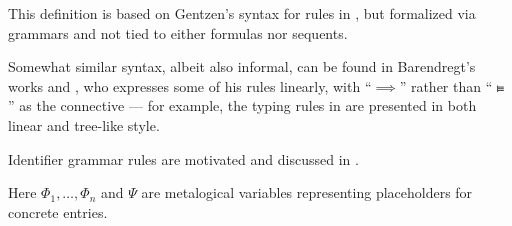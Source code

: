 \begin{comments}
  \item This definition is based on Gentzen's syntax for rules in \cite[181]{Gentzen1935LogischeSchließen}, but formalized via grammars and not tied to either formulas nor sequents.

  \item Somewhat similar syntax, albeit also informal, can be found in Barendregt's works \cite{Barendregt1984LambdaCalculus} and \cite{Barendregt1992Types}, who expresses some of his rules linearly, with \enquote{\( {\implies} \)} rather than \enquote{\( \vDdash \)} as the connective --- for example, the typing rules in \cite[def. 3.1.3]{Barendregt1992Types} are presented in both linear and tree-like style.

  \item Identifier grammar rules are motivated and discussed in .

  \item Here \( \Phi_1, \ldots, \Phi_n \) and \( \Psi \) are metalogical variables representing placeholders for concrete entries.
\end{comments}


